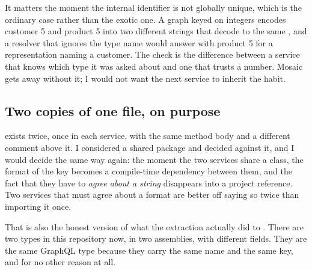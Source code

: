 It matters the moment the internal identifier is not globally unique, which is
the ordinary case rather than the exotic one. A graph keyed on integers encodes
customer 5 and product 5 into two different strings that decode to the same
, and a resolver that ignores the type name would answer with product 5
for a representation naming a customer. The check is the difference between a
service that knows which type it was asked about and one that trusts a number.
Mosaic gets away without it; I would not want the next service to inherit the
habit.

\subsection*{Two copies of one file, on purpose}

%
 exists twice, once in each service, with the same method body
and a different comment above it. I considered a shared package and decided
against it, and I would decide the same way again: the moment the two services
share a class, the format of the key becomes a compile-time dependency between
them, and the fact that they have to \emph{agree about a string} disappears
into a project reference. Two services that must agree about a format are
better off saying so twice than importing it once.

That is also the honest version of what the extraction actually did to
. There are two  types in this repository now, in
two assemblies, with different fields. They are the same GraphQL type because
they carry the same name and the same key, and for no other reason at all.

%
